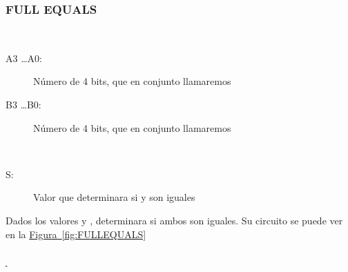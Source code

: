 \documentclass{article}
\newcommand*{\figref}[2][]{
  \hyperref[{fig:#2}]{
    Figura~\ref*{fig:#2}
    \ifx\\#1\\%
    \else
      \,#1
    \fi
  }
}
\begin{document}
\subsubsection{FULL EQUALS}
\label{sec:FULLEQUALS}
\begin{description}
    \item[Entradas: ] 
    \begin{description}
          \item[A3 \dots A0:] Número de 4 bits, que en conjunto llamaremos 
          \item[B3 \dots B0:] Número de 4 bits, que en conjunto llamaremos 
    \end{description}
    
    \item[Salidas: ] 
    \begin{description}
        \item[S: ] Valor que determinara si  y  son iguales
    \end{description}
    
    \item[Función: ] Dados los valores  y , determinara si ambos son iguales. Su circuito se puede ver en la \figref{FULLEQUALS} 
    
\end{description}
\end{document}
